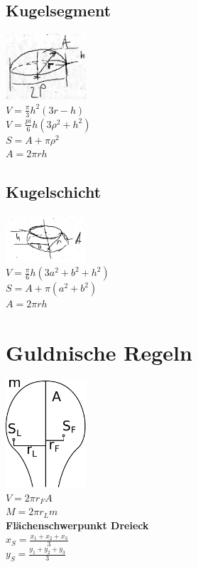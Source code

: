 \documentclass[10pt,a4paper]{article}
\begin{document}
\begin{multicols}{4}
		\subsection{Kugelsegment}
		\includegraphics[width=3cm]{imgs/kugseg}\\
		\( V = \frac{\pi}{3} h^2 (3r - h) \)\\
		\( V = \frac{pi}{6} h (3 \rho^2 + h^2) \)\\
		\( S = A + \pi \rho^2 \)\\
		\( A = 2 \pi r h \)
		
		\subsection{Kugelschicht}
		\includegraphics[width=3cm]{imgs/kugsch}\\
		\( V = \frac{\pi}{6} h (3a^2 + b^2 + h^2) \)\\
		\( S = A + \pi (a^2 + b^2) \)\\
		\( A = 2 \pi r h \)
	
		\section{Guldnische Regeln}
		\includegraphics[width=3cm]{imgs/rotat}\\
		\( V = 2 \pi r_F A \)\\
		\( M = 2 \pi r_L m \)\\
		\textbf{Flächenschwerpunkt Dreieck}\\
		\( x_S = \frac{x_1 + x_2 + x_3}{3} \)\\
		\( y_S = \frac{y_1 + y_2 + y_3}{3} \)
		

\end{multicols}
\end{document}
